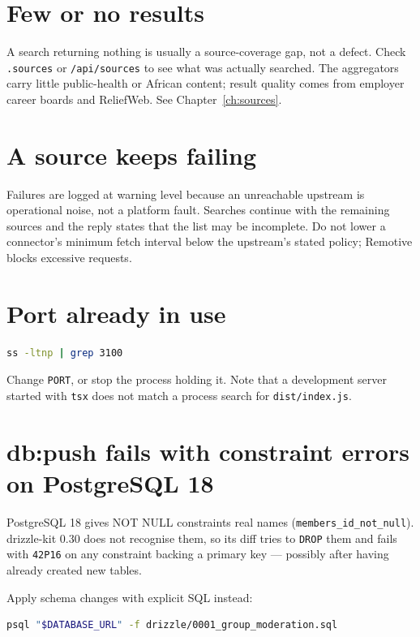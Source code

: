 \documentclass[11pt,a4paper]{report}
\newcommand{\dash}{---}
\begin{document}
\section*{Few or no results}

A search returning nothing is usually a source-coverage gap, not a defect.
Check \texttt{.sources} or \texttt{/api/sources} to see what was actually
searched. The aggregators carry little public-health or African content;
result quality comes from employer career boards and ReliefWeb. See
Chapter~\ref{ch:sources}.

\section*{A source keeps failing}

Failures are logged at warning level because an unreachable upstream is
operational noise, not a platform fault. Searches continue with the remaining
sources and the reply states that the list may be incomplete. Do not lower a
connector's minimum fetch interval below the upstream's stated policy;
Remotive blocks excessive requests.

\section*{Port already in use}

\begin{lstlisting}[language=bash]
ss -ltnp | grep 3100
\end{lstlisting}

Change \texttt{PORT}, or stop the process holding it. Note that a development
server started with \texttt{tsx} does not match a process search for
\texttt{dist/index.js}.

\section*{db:push fails with constraint errors on PostgreSQL 18}

PostgreSQL 18 gives NOT NULL constraints real names
(\texttt{members\_id\_not\_null}). drizzle-kit 0.30 does not recognise them, so
its diff tries to \texttt{DROP} them and fails with \texttt{42P16} on any
constraint backing a primary key \dash{} possibly after having already created
new tables.

Apply schema changes with explicit SQL instead:

\begin{lstlisting}[language=bash]
psql "$DATABASE_URL" -f drizzle/0001_group_moderation.sql
\end{lstlisting}
\end{document}
